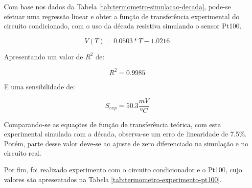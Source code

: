 \documentclass[a4paper]{instrumentacao}
\begin{document}
Com base nos dados da Tabela \ref{tab:termometro-simulacao-decada}, pode-se efetuar uma regressão linear e obter a função de transferência experimental do circuito condicionado, com o uso da década resistiva simulando o sensor Pt100.

\begin{equation}
	V(T)=0.0503*T-1.0216
	\label{eq:termometro-tf-experimental-decada}
\end{equation}

Apresentando um valor de $R^2$ de:

\begin{equation}
	R^2=0.9985
	\label{eq:termometro-r2-tf-experimental-decada}
\end{equation}

E uma sensibilidade de:

\begin{equation}
	S_{exp}=50.3\frac{mV}{ºC}
	\label{eq:termometro-sensibilidade-experimental-decada}
\end{equation}

Comparando-se as equações de função de transferência teórica, com esta experimental simulada com a década, observa-se um erro de linearidade de 7.5$\%$. Porém, parte desse valor deve-se ao ajuste de zero diferenciado na simulação e no circuito real.

Por fim, foi realizado experimento com o circuito condicionador e o Pt100, cujo valores são apresentados na Tabela \ref{tab:termometro-experimento-pt100}.
\end{document}
